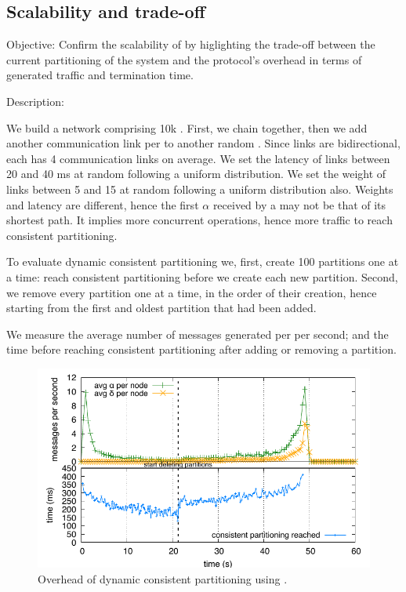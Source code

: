 \subsection{Scalability and trade-off}
\begin{asparadesc}
\item [Objective:] Confirm the scalability of \NAME by higlighting the
  trade-off between the current partitioning of the system and the
  protocol's overhead in terms of generated traffic and termination
  time.
  
\item [Description:]
  
We build a network comprising 10k \processes. First, we chain
\processes together, then we add another communication link per
\process to another random \process. Since links are bidirectional,
each \process has 4 communication links on average. We set the latency
of links between 20 and 40 ms at random following a uniform
distribution. We set the weight of links between 5 and 15 at random
following a uniform distribution also. Weights and latency are different,
hence the first $\alpha$ received by a \process may not be that of its
shortest path. It implies more concurrent operations, hence more
traffic to reach consistent partitioning.

\noindent To evaluate dynamic consistent partitioning we, first, 
create 100 partitions one at a time: \processes reach consistent
partitioning before we create each new partition. Second, we remove
every partition one at a time, in the order of their creation, hence
starting from the first and oldest partition that had been added.

\noindent We measure the average number of messages generated per
\process per second; and the time before reaching consistent
partitioning after adding or removing a partition.

\begin{figure}
  \centering\includegraphics[width=\FIGSCALE\columnwidth]{img/as_cast_complexity.pdf}
  \caption{\label{fig:complexity}Overhead of dynamic consistent partitioning
    using \NAME.}
  

\end{figure}
\end{asparadesc}
